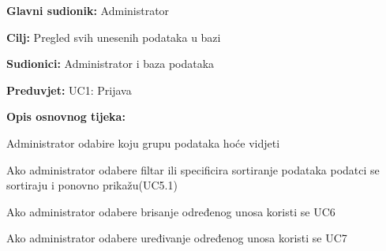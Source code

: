 					\noindent {}
					\begin{packed_item}
						
						\item \textbf{Glavni sudionik:} Administrator
						\item  \textbf{Cilj:} Pregled svih unesenih podataka u bazi
						\item  \textbf{Sudionici:} Administrator i baza podataka
						\item  \textbf{Preduvjet:} UC1: Prijava
						\item  \textbf{Opis osnovnog tijeka:}
						
						\item[] \begin{packed_enum}
							
							\item Administrator odabire koju grupu podataka hoće vidjeti
							\item Ako administrator odabere filtar ili specificira sortiranje podataka podatci se sortiraju i ponovno prikažu(UC5.1)
							\item Ako administrator odabere brisanje određenog unosa koristi se UC6
							\item Ako administrator odabere uređivanje određenog unosa koristi se UC7
							
						\end{packed_enum}
						
					\end{packed_item}
					
